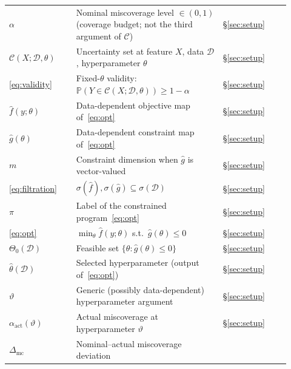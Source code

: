 \documentclass[12pt]{article}
\theoremstyle{plain}
\begin{document}
\begin{center}
\begin{longtable}{@{}>{\raggedright\arraybackslash}p{0.22\linewidth}
                  >{\raggedright\arraybackslash}p{0.48\linewidth}
                  >{\raggedright\arraybackslash}p{0.22\linewidth}@{}}
\hyperref[def:alpha]{$\alpha$} &
  Nominal miscoverage level $\in(0,1)$ (coverage budget; not the third argument of $\mathcal{C}$) &
  \hyperref[def:alpha]{\S\ref{sec:setup}} \\
\hyperref[def:C]{$\mathcal{C}(X;\mathcal{D},\theta)$} &
  Uncertainty set at feature $X$, data $\mathcal{D}$, hyperparameter $\theta$ &
  \hyperref[def:C]{\S\ref{sec:setup}} \\
\hyperref[eq:validity]{\eqref{eq:validity}} &
  Fixed-$\theta$ validity: $\mathbb{P}(Y\in\mathcal{C}(X;\mathcal{D},\theta))\ge 1-\alpha$ &
  \hyperref[def:validity]{\S\ref{sec:setup}} \\
\hyperref[def:fhat-ghat]{$\hat f(y;\theta)$} &
  Data-dependent objective map of~\eqref{eq:opt} &
  \hyperref[def:fhat-ghat]{\S\ref{sec:setup}} \\
\hyperref[def:fhat-ghat]{$\hat g(\theta)$} &
  Data-dependent constraint map of~\eqref{eq:opt} &
  \hyperref[def:fhat-ghat]{\S\ref{sec:setup}} \\
\hyperref[def:fhat-ghat]{$m$} &
  Constraint dimension when $\hat g$ is vector-valued &
  \hyperref[def:fhat-ghat]{\S\ref{sec:setup}} \\
\hyperref[eq:filtration]{\eqref{eq:filtration}} &
  $\sigma(\hat f),\sigma(\hat g)\subseteq\sigma(\mathcal{D})$ &
  \hyperref[eq:filtration]{\S\ref{sec:setup}} \\
\hyperref[def:pi]{$\pi$} &
  Label of the constrained program~\eqref{eq:opt} &
  \hyperref[def:pi]{\S\ref{sec:setup}} \\
\hyperref[eq:opt]{\eqref{eq:opt}} &
  $\min_\theta\hat f(y;\theta)$ s.t.\ $\hat g(\theta)\le 0$ &
  \hyperref[eq:opt]{\S\ref{sec:setup}} \\
\hyperref[def:feasible]{$\Theta_0(\mathcal{D})$} &
  Feasible set $\{\theta:\hat g(\theta)\le 0\}$ &
  \hyperref[def:feasible]{\S\ref{sec:setup}} \\
\hyperref[def:thetahat]{$\hat\theta(\mathcal{D})$} &
  Selected hyperparameter (output of~\eqref{eq:opt}) &
  \hyperref[def:thetahat]{\S\ref{sec:setup}} \\
\hyperref[def:alpha-act]{$\vartheta$} &
  Generic (possibly data-dependent) hyperparameter argument &
  \hyperref[def:alpha-act]{\S\ref{sec:setup}} \\
\hyperref[def:alpha-act]{$\alpha_{\mathrm{act}}(\vartheta)$} &
  Actual miscoverage at hyperparameter $\vartheta$ &
  \hyperref[def:alpha-act]{\S\ref{sec:setup}} \\
\hyperref[def:Delta-mc]{$\Delta_{\mathrm{mc}}$} &
  Nominal--actual miscoverage deviation &

\end{longtable}
\end{center}
\end{document}
